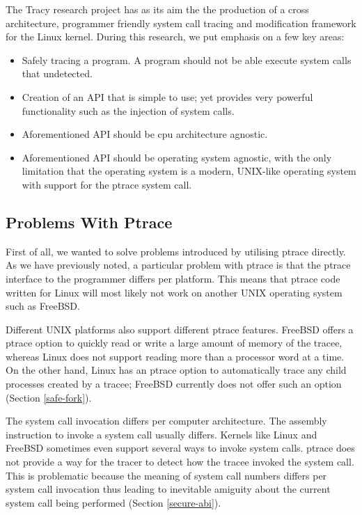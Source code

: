 \documentclass[a4paper, 10pt]{report}
\begin{document}
The Tracy research project has as its aim the the production of a cross
architecture, programmer friendly system call tracing and modification
framework for the Linux kernel.
During this research, we put emphasis on a few key areas:
\begin{itemize}
\item Safely tracing a program. A program should not be able execute system
    calls that undetected.
\item Creation of an API that is simple to use; yet provides very powerful
    functionality such as the injection of system calls.
\item Aforementioned API should be cpu architecture agnostic.
\item Aforementioned API should be operating system agnostic, with the only
    limitation that the operating system is a modern, UNIX-like operating
    system with support for the ptrace system call.
\end{itemize}

\subsection{Problems With Ptrace}
First of all, we wanted to solve problems introduced by utilising ptrace
directly. As we have previously noted, a particular problem with ptrace is that
the ptrace interface to the programmer differs per platform. This means that
ptrace code written for Linux will most likely not work on another UNIX operating
system such as FreeBSD.

Different UNIX platforms also support different ptrace features. FreeBSD offers
a ptrace option to quickly read or write a large amount of memory of the
tracee, whereas Linux does not support reading more than a processor word at a
time. On the other hand, Linux has an ptrace option to automatically trace
any child processes created by a tracee; FreeBSD currently does not offer such
an option (Section \ref{safe-fork}).

The system call invocation differs per computer architecture.
The assembly instruction to invoke a system call usually differs.
Kernels like Linux and FreeBSD sometimes even support several ways to invoke
system calls. ptrace does not provide a way for the tracer to detect how
the tracee invoked the system call. This is problematic because the meaning
of system call numbers differs per system call invocation thus leading to
inevitable amiguity about the current system call being performed (Section
\ref{secure-abi}).
\end{document}
